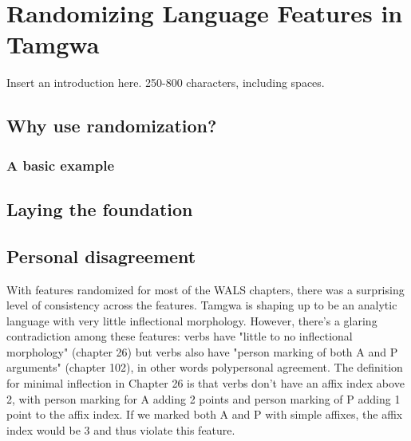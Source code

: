 \documentclass[a4paper,12pt,twoside,openright]{memoir}
\begin{document}


\chapter[Randomizing Language Features][Tamgwa]{Randomizing Language Features in Tamgwa}


\thispagestyle{fancy}
\BgUsetrue


Insert an introduction here. 250-800 characters, including spaces.

\section*{Why use randomization?} %

\lipsum[1]

\subsection*{A basic example}

\lipsum[2]

\section*{Laying the foundation} %

\lipsum[4]

\section*{Personal disagreement} %

With features randomized for most of the WALS chapters, there was a surprising level of consistency across the features.  Tamgwa is shaping up to be an analytic language with very little inflectional morphology. However, there's a glaring contradiction among these features: verbs have "little to no inflectional morphology" (chapter 26) but verbs also have "person marking of both A and P arguments" (chapter 102), in other words polypersonal agreement.  The definition for minimal inflection in Chapter 26 is that verbs don't have an affix index above 2, with person marking for A adding 2 points and person marking of P adding 1 point to the affix index.  If we marked both A and P with simple affixes, the affix index would be 3 and thus violate this feature.
\end{document}
